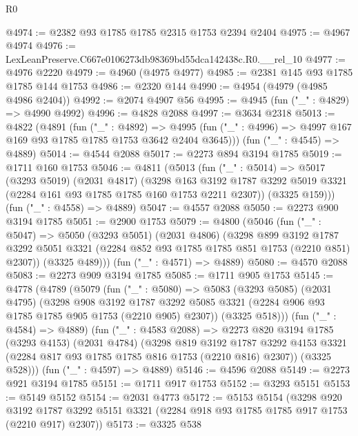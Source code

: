 \begin{lexlean}{R0}
\begin{coremodule}
@4974 := @2382 @93 @1785 @1785 @2315 @1753 @2394 @2404
@4975 := @4967 @4974
@4976 := LexLeanPreserve.C667e0106273db98369bd55dca142438c.R0.__rel_10
@4977 := @4976 @2220
@4979 := @4960 (@4975 @4977)
@4985 := @2381 @145 @93 @1785 @1785 @144 @1753
@4986 := @2320 @144
@4990 := @4954 (@4979 (@4985 @4986 @2404))
@4992 := @2074 @4907 @56
@4995 := @4945 (fun ("_" : @4829) => @4990 @4992)
@4996 := @4828 @2088
@4997 := @3634 @2318
@5013 := @4822
    (@4891
      (fun ("_" : @4892) =>
      @4995 (fun ("_" : @4996) => @4997 @167 @169 @93 @1785 @1785 @1753 @3642 @2404 @3645)))
    (fun ("_" : @4545) => @4889)
@5014 := @4544 @2088
@5017 := @2273 @894 @3194 @1785
@5019 := @1711 @160 @1753
@5046 := @4811
    (@5013
      (fun ("_" : @5014) =>
      @5017
        (@3293 @5019)
        (@2031 @4817)
        (@3298
          @163
          @3192
          @1787
          @3292
          @5019
          @3321
          (@2284 @161 @93 @1785 @1785 @160 @1753 @2211 @2307))
        (@3325 @159)))
    (fun ("_" : @4558) => @4889)
@5047 := @4557 @2088
@5050 := @2273 @900 @3194 @1785
@5051 := @2900 @1753
@5079 := @4800
    (@5046
      (fun ("_" : @5047) =>
      @5050
        (@3293 @5051)
        (@2031 @4806)
        (@3298
          @899
          @3192
          @1787
          @3292
          @5051
          @3321
          (@2284 @852 @93 @1785 @1785 @851 @1753 (@2210 @851) @2307))
        (@3325 @489)))
    (fun ("_" : @4571) => @4889)
@5080 := @4570 @2088
@5083 := @2273 @909 @3194 @1785
@5085 := @1711 @905 @1753
@5145 := @4778
    (@4789
      (@5079
        (fun ("_" : @5080) =>
        @5083
          (@3293 @5085)
          (@2031 @4795)
          (@3298
            @908
            @3192
            @1787
            @3292
            @5085
            @3321
            (@2284 @906 @93 @1785 @1785 @905 @1753 (@2210 @905) @2307))
          (@3325 @518)))
      (fun ("_" : @4584) => @4889)
      (fun ("_" : @4583 @2088) =>
      @2273
        @820
        @3194
        @1785
        (@3293 @4153)
        (@2031 @4784)
        (@3298
          @819
          @3192
          @1787
          @3292
          @4153
          @3321
          (@2284 @817 @93 @1785 @1785 @816 @1753 (@2210 @816) @2307))
        (@3325 @528)))
    (fun ("_" : @4597) => @4889)
@5146 := @4596 @2088
@5149 := @2273 @921 @3194 @1785
@5151 := @1711 @917 @1753
@5152 := @3293 @5151
@5153 := @5149 @5152
@5154 := @2031 @4773
@5172 := @5153
    @5154
    (@3298
      @920
      @3192
      @1787
      @3292
      @5151
      @3321
      (@2284 @918 @93 @1785 @1785 @917 @1753 (@2210 @917) @2307))
@5173 := @3325 @538

\end{coremodule}
\end{lexlean}
